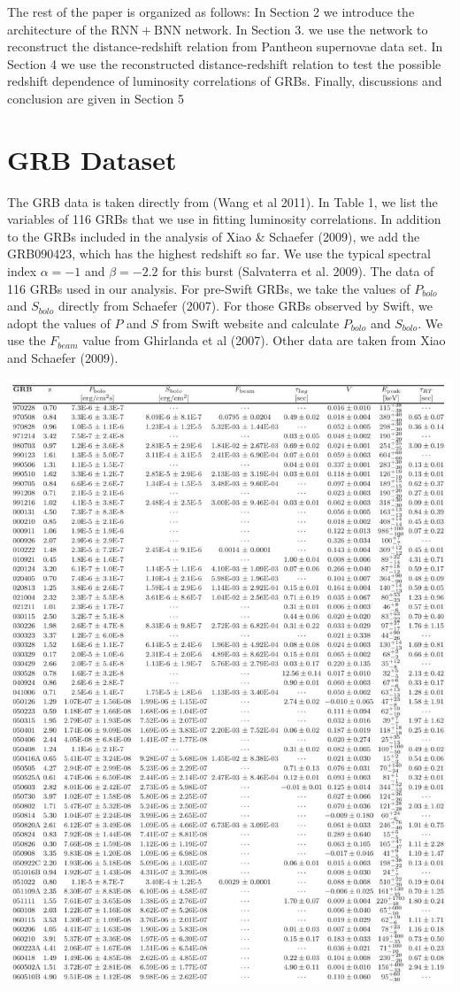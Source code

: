 \documentclass[10pt, a4paper]{article}
\begin{document}
The rest of the paper is organized as follows: In Section 2 we introduce the architecture of the $\mathrm{RNN}+\mathrm{BNN}$ network. In Section 3. we use the network to reconstruct the distance-redshift relation from Pantheon supernovae data set. In Section 4 we use the reconstructed distance-redshift relation to test the possible redshift dependence of luminosity correlations of GRBs. Finally, discussions and conclusion are given in Section 5

\section{GRB Dataset}
The GRB data is taken directly from (Wang et al 2011). In Table 1, we list the variables of 116 GRBs that we use in fitting luminosity correlations. In addition to the GRBs included in the analysis of Xiao \& Schaefer (2009), we add the GRB090423, which has the highest redshift so far. We use the typical spectral index $\alpha=-1$ and $\beta=-2.2$ for this burst (Salvaterra et al. 2009). The data of 116 GRBs used in our analysis. For pre-Swift GRBs, we take the values of $P_{bolo}$ and $S_{bolo}$ directly from Schaefer (2007). For those GRBs observed by Swift, we adopt the values of $P$ and $S$ from Swift website and calculate $P_{bolo}$ and $S_{bolo}$. We use the $F_{beam}$ value from Ghirlanda et al (2007). Other data are taken from Xiao and Schaefer (2009).

\includegraphics[max width=\textwidth]{GRB_dataset_1.jpg}
\end{document}
